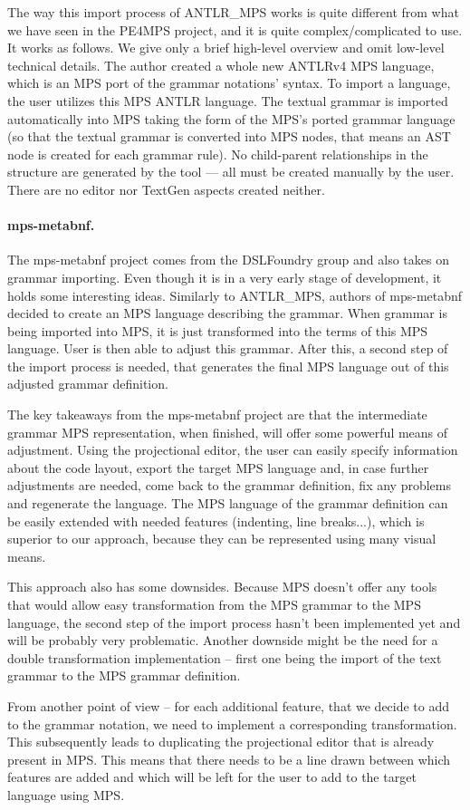 The way this import process of ANTLR{\_}MPS works is quite different from what we have seen in the PE4MPS project, and it is quite complex/complicated to use.
It works as follows. We give only a brief high-level overview and omit low-level technical details.
The author created a whole new ANTLRv4 MPS language, which is an MPS port of the grammar notations' syntax.
To import a language, the user utilizes this MPS ANTLR language.
The textual grammar is imported automatically into MPS taking the form of the MPS's ported grammar language (so that the textual grammar is converted into MPS nodes, that means an AST node is created for each grammar rule).
No child-parent relationships in the structure are generated by the tool --- all must be created manually by the user.
There are no editor nor TextGen aspects created neither.

\paragraph{mps-metabnf.}
The mps-metabnf project comes from the DSLFoundry group and also takes on grammar importing.
Even though it is in a very early stage of development, it holds some interesting ideas.
Similarly to ANTLR{\_}MPS, authors of mps-metabnf decided to create an MPS language describing the grammar.
When grammar is being imported into MPS, it is just transformed into the terms of this MPS language.
User is then able to adjust this grammar.
After this, a second step of the import process is needed, that generates the final MPS language out of this adjusted grammar definition.

The key takeaways from the mps-metabnf project are that the intermediate grammar MPS representation, when finished, will offer some powerful means of adjustment.
Using the projectional editor, the user can easily specify information about the code layout, export the target MPS language and, in case further adjustments are needed, come back to the grammar definition, fix any problems and regenerate the language.
The MPS language of the grammar definition can be easily extended with needed features (indenting, line breaks...), which is superior to our approach, because they can be represented using many visual means.

This approach also has some downsides.
Because MPS doesn't offer any tools that would allow easy transformation from the MPS grammar to the MPS language, the second step of the import process hasn't been implemented yet and will be probably very problematic.
Another downside might be the need for a double transformation implementation -- first one being the import of the text grammar to the MPS grammar definition.

From another point of view -- for each additional feature, that we decide to add to the grammar notation, we need to implement a corresponding transformation.
This subsequently leads to duplicating the projectional editor that is already present in MPS.
This means that there needs to be a line drawn between which features are added and which will be left for the user to add to the target language using MPS.


